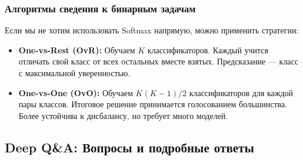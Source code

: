 \documentclass[12pt]{article}
\begin{document}
\subsubsection{Алгоритмы сведения к бинарным задачам}
Если мы не хотим использовать Softmax напрямую, можно применить стратегии:
\begin{itemize}
    \item \textbf{One-vs-Rest (OvR):} Обучаем $K$ классификаторов. Каждый учится отличать свой класс от всех остальных вместе взятых. Предсказание — класс с максимальной уверенностью.
    \item \textbf{One-vs-One (OvO):} Обучаем $K(K-1)/2$ классификаторов для каждой пары классов. Итоговое решение принимается голосованием большинства. Более устойчива к дисбалансу, но требует много моделей.
\end{itemize}

\newpage
\subsection{Deep Q\&A: Вопросы и подробные ответы}
\end{document}
